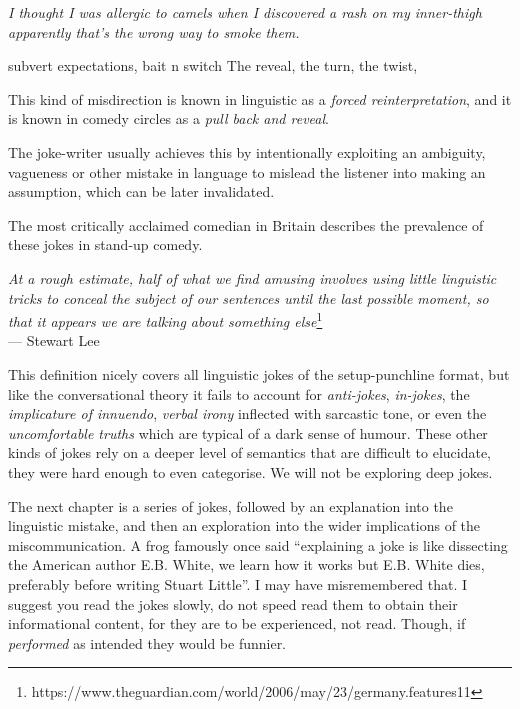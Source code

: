 \begin{center}
\textit{I thought I was allergic to camels when I discovered a rash on my inner-thigh
\\ apparently that's the wrong way to smoke them.}
\end{center}

subvert expectations, bait n switch
The reveal, the turn, the twist, 

This kind of misdirection is known in linguistic as a \textit{forced reinterpretation}, and it is known in comedy circles as a \textit{pull back and reveal}. 

The joke-writer usually achieves this by intentionally exploiting an ambiguity, vagueness or other mistake in language to mislead the listener into making an assumption, which can be later invalidated. 



The most critically acclaimed comedian in Britain describes the prevalence of these jokes in stand-up comedy.

\begin{center}
\textit{At a rough estimate, half of what we find amusing involves using little linguistic tricks to conceal the subject of our sentences until the last possible moment, so that it appears we are talking about something else}\footnote{https://www.theguardian.com/world/2006/may/23/germany.features11}
\\ --- Stewart Lee
\end{center}


This definition nicely covers all linguistic jokes of the setup-punchline format, but like the conversational theory it fails to account for \textit{anti-jokes}, \textit{in-jokes}, the \textit{implicature of innuendo}, \textit{verbal irony} inflected with sarcastic tone, or even the \textit{uncomfortable truths} which are typical of a dark sense of humour. These other kinds of jokes rely on a deeper level of semantics that are difficult to elucidate, they were hard enough to even categorise. We will not be exploring deep jokes.

The next chapter is a series of jokes, followed by an explanation into the linguistic mistake, and then an exploration into the wider implications of the miscommunication. A frog famously once said ``explaining a joke is like dissecting the American author E.B. White, we learn how it works but E.B. White dies, preferably before writing Stuart Little''. I may have misremembered that. I suggest you read the jokes slowly, do not speed read them to obtain their informational content, for they are to be experienced, not read. Though, if \textit{performed} as intended they would be funnier.

